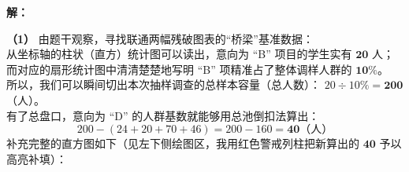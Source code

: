 \documentclass[12pt, a4paper]{ctexrep}
\begin{document}
\vspace{0.4cm}
\textbf{解：}

\textbf{（1）} 由题干观察，寻找联通两幅残破图表的“桥梁”基准数据：\\
从坐标轴的柱状（直方）统计图可以读出，意向为 “B” 项目的学生实有 $\boldsymbol{20}$ 人；而对应的扇形统计图中清清楚楚地写明 “B” 项精准占了整体调样人群的 $\boldsymbol{10\%}$。\\
所以，我们可以瞬间切出本次抽样调查的总样本容量（总人数）： $20 \div 10\% = \boldsymbol{200}$（人）。\\
有了总盘口，意向为 “D” 的人群基数就能够用总池倒扣法算出：
$$200 - (24 + 20 + 70 + 46) = 200 - 160 = \boldsymbol{40}\text{（人）}$$
补充完整的直方图如下（见左下侧绘图区，我用红色警戒列柱把新算出的 $\boldsymbol{40}$ 予以高亮补填）：

\vspace{0.4cm}
\end{document}
